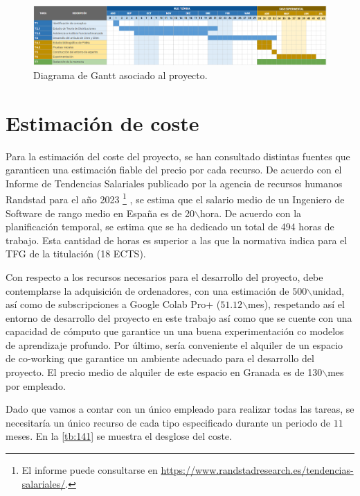  \begin{figure}[htbp]
    \centering
    \includegraphics[width=1\textwidth]{img/img61.png}
    \caption{Diagrama de Gantt asociado al proyecto.}
    \label{fig:img61}
\end{figure}


\section{Estimación de coste}

Para la estimación del coste del proyecto, se han consultado distintas fuentes que garanticen una estimación fiable del precio por cada recurso. De acuerdo con el Informe de Tendencias Salariales publicado por la agencia de recursos humanos Randstad para el año 2023 \footnote{El informe puede consultarse en  \href{https://www.randstadresearch.es/tendencias-salariales/}{https://www.randstadresearch.es/tendencias-salariales/}.} , se estima que el salario medio de un Ingeniero de Software de rango medio en España es de 20\EUR $\backslash $hora. De acuerdo con la planificación temporal, se estima que se ha dedicado un total de 494 horas de trabajo. Esta cantidad de horas es superior a las que la normativa indica para el TFG de la titulación (18 ECTS).

Con respecto a los recursos necesarios para el desarrollo del proyecto, debe contemplarse la adquisición de ordenadores, con una estimación de $500$\EUR$\backslash $unidad, así como de subscripciones a Google Colab Pro+ ($51.12$\EUR$\backslash $mes), respetando así  el entorno de desarrollo del proyecto en este trabajo así como que se cuente con una capacidad de cómputo que garantice un una buena experimentación co modelos de aprendizaje profundo. Por último, sería conveniente el alquiler de un espacio de co-working que garantice un ambiente adecuado para el desarrollo del proyecto. El precio medio de alquiler de este espacio en Granada es de 130\EUR$\backslash $mes por empleado.


Dado que vamos a contar con un único empleado para realizar todas las tareas, se necesitaría un único recurso de cada tipo especificado durante un periodo de $11$ meses. En la \autoref{tb:141} se muestra el desglose del coste. 


